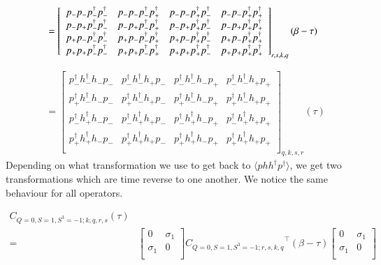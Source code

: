 \begin{equation}
  \begin{aligned}
    &= \left[ 
    {\begin{array}{cccc}
      p_{-}p_{-}p^\dagger_{-}p^\dagger_{-} & p_{-}p_{-}p^\dagger_{-}p^\dagger_{+} & p_{-}p_{-}p^\dagger_{+}p^\dagger_{-} & p_{-}p_{-}p^\dagger_{+}p^\dagger_{+} \\
      p_{-}p_{+}p^\dagger_{-}p^\dagger_{-} & p_{-}p_{+}p^\dagger_{-}p^\dagger_{+} & p_{-}p_{+}p^\dagger_{+}p^\dagger_{-} & p_{-}p_{+}p^\dagger_{+}p^\dagger_{+} \\
      p_{+}p_{-}p^\dagger_{-}p^\dagger_{-} & p_{+}p_{-}p^\dagger_{-}p^\dagger_{+} & p_{+}p_{-}p^\dagger_{+}p^\dagger_{-} & p_{+}p_{-}p^\dagger_{+}p^\dagger_{+} \\
      p_{+}p_{+}p^\dagger_{-}p^\dagger_{-} & p_{+}p_{+}p^\dagger_{-}p^\dagger_{+} & p_{+}p_{+}p^\dagger_{+}p^\dagger_{-} & p_{+}p_{+}p^\dagger_{+}p^\dagger_{+} \\
    \end{array} } 
    \right]_{r,s,k,q} (\beta-\tau) \\
  \end{aligned}
\end{equation}

\renewcommand{\dcor}[4]{p_{#2}^\dagger h_{#1}^\dagger h_{#4} p_{#3}}

\begin{equation}
  \begin{aligned}
    &= \left[ {\begin{array}{cccc}
      \dcor{-}{-}{-}{-} & \dcor{-}{-}{-}{+} & \dcor{-}{-}{+}{-} & \dcor{-}{-}{+}{+} \\
      \dcor{-}{+}{-}{-} & \dcor{-}{+}{-}{+} & \dcor{-}{+}{+}{-} & \dcor{-}{+}{+}{+} \\
      \dcor{+}{-}{-}{-} & \dcor{+}{-}{-}{+} & \dcor{+}{-}{+}{-} & \dcor{+}{-}{+}{+} \\
      \dcor{+}{+}{-}{-} & \dcor{+}{+}{-}{+} & \dcor{+}{+}{+}{-} & \dcor{+}{+}{+}{+} \\
    \end{array} } \right]_{q,k,s,r} (\tau)
  \end{aligned}
\end{equation}
Depending on what transformation we use to get back to $\langle phh^\dagger p^\dagger\rangle$, we get two transformations which are time reverse to one another. We notice the same behaviour for all operators.

\begin{equation}
  \begin{aligned}
    C_{Q=0,S=1,S^3=-1;k,q,r,s} (\tau) \\
    =& \left[ {\begin{array}{cc}
      0 & \sigma_1 \\
      \sigma_1 & 0 \\
    \end{array} } \right]
    {C_{Q=0,S=1,S^3=-1;r,s,k,q}}^\top (\beta-\tau)
    \left[ {\begin{array}{cc}
      0 & \sigma_1 \\
      \sigma_1 & 0 \\
    \end{array} } \right]
  \end{aligned}
\end{equation}


